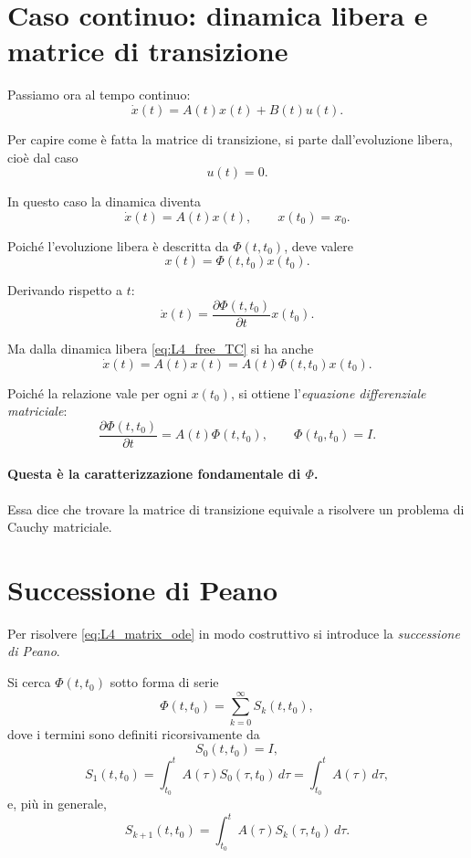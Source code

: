 \section{Caso continuo: dinamica libera e matrice di transizione}

Passiamo ora al tempo continuo:
\begin{equation}
\dot x(t)=A(t)x(t)+B(t)u(t).
\label{eq:L4_sys_TC}
\end{equation}

Per capire come è fatta la matrice di transizione, si parte dall'evoluzione libera, cioè dal caso
\[
u(t)=0.
\]

In questo caso la dinamica diventa
\begin{equation}
\dot x(t)=A(t)x(t),
\qquad x(t_0)=x_0.
\label{eq:L4_free_TC}
\end{equation}

Poiché l'evoluzione libera è descritta da $\Phi(t,t_0)$, deve valere
\[
x(t)=\Phi(t,t_0)x(t_0).
\]

Derivando rispetto a $t$:
\[
\dot x(t)=\frac{\partial \Phi(t,t_0)}{\partial t}x(t_0).
\]

Ma dalla dinamica libera \eqref{eq:L4_free_TC} si ha anche
\[
\dot x(t)=A(t)x(t)=A(t)\Phi(t,t_0)x(t_0).
\]

Poiché la relazione vale per ogni $x(t_0)$, si ottiene l'\emph{equazione differenziale matriciale}:
\begin{equation}
\boxed{
\frac{\partial \Phi(t,t_0)}{\partial t}=A(t)\Phi(t,t_0),
\qquad
\Phi(t_0,t_0)=I.
}
\label{eq:L4_matrix_ode}
\end{equation}

\paragraph{Questa è la caratterizzazione fondamentale di $\Phi$.}
Essa dice che trovare la matrice di transizione equivale a risolvere un problema di Cauchy matriciale.

\section{Successione di Peano}

Per risolvere \eqref{eq:L4_matrix_ode} in modo costruttivo si introduce la \emph{successione di Peano}.

Si cerca $\Phi(t,t_0)$ sotto forma di serie
\begin{equation}
\Phi(t,t_0)=\sum_{k=0}^{\infty} S_k(t,t_0),
\label{eq:L4_peano_series}
\end{equation}
dove i termini sono definiti ricorsivamente da
\begin{equation}
S_0(t,t_0)=I,
\label{eq:L4_S0}
\end{equation}
\begin{equation}
S_1(t,t_0)=\int_{t_0}^{t}A(\tau)S_0(\tau,t_0)\,d\tau
=
\int_{t_0}^{t}A(\tau)\,d\tau,
\label{eq:L4_S1}
\end{equation}
e, più in generale,
\begin{equation}
S_{k+1}(t,t_0)=\int_{t_0}^{t}A(\tau)S_k(\tau,t_0)\,d\tau.
\label{eq:L4_Sk_rec}
\end{equation}

